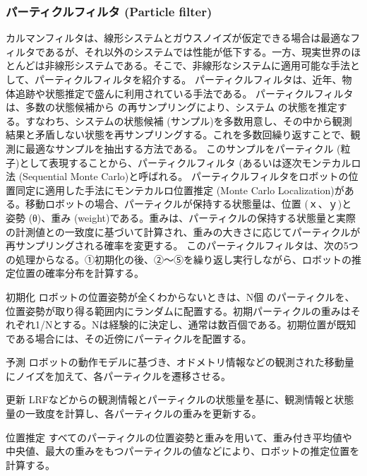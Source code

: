 \subsubsection{パーティクルフィルタ (Particle filter)}

カルマンフィルタは、線形システムとガウスノイズが仮定できる場合は最適なフィルタであるが、それ以外のシステムでは性能が低下する。一方、現実世界のほとんどは非線形システムである。そこで、非線形なシステムに適用可能な手法として、パーティクルフィルタを紹介する。
パーティクルフィルタは、近年、物体追跡や状態推定で盛んに利用されている手法である。 パーティクルフィルタは、多数の状態候補から  の再サンプリングにより、システム  の状態を推定する。すなわち、システムの状態候補 (サンプル)を多数用意し、その中から観測結果と矛盾しない状態を再サンプリングする。これを多数回繰り返すことで、観測に最適なサンプルを抽出する方法である。  このサンプルをパーティクル (粒子)として表現することから、パーティクルフィルタ (あるいは逐次モンテカルロ法 (Sequential Monte Carlo)と呼ばれる。
パーティクルフィルタをロボットの位置同定に適用した手法にモンテカルロ位置推定 (Monte Carlo Localization)がある。移動ロボットの場合、パーティクルが保持する状態量は、位置 (ｘ、ｙ)と姿勢 (θ)、重み (weight)である。重みは、パーティクルの保持する状態量と実際の計測値との一致度に基づいて計算され、重みの大きさに応じてパーティクルが再サンプリングされる確率を変更する。
このパーティクルフィルタは、次の5つの処理からなる。①初期化の後、②〜⑤を繰り返し実行しながら、ロボットの推定位置の確率分布を計算する。

\setcounter{num}{0}

\circled{\thenum} 初期化
ロボットの位置姿勢が全くわからないときは、N個  のパーティクルを、位置姿勢が取り得る範囲内にランダムに配置する。初期パーティクルの重みはそれぞれ1/Nとする。Nは経験的に決定し、通常は数百個である。初期位置が既知である場合には、その近傍にパーティクルを配置する。

\circled{\thenum} 予測
ロボットの動作モデルに基づき、オドメトリ情報などの観測された移動量にノイズを加えて、各パーティクルを遷移させる。

\circled{\thenum} 更新
LRFなどからの観測情報とパーティクルの状態量を基に、観測情報と状態量の一致度を計算し、各パーティクルの重みを更新する。

\circled{\thenum} 位置推定
すべてのパーティクルの位置姿勢と重みを用いて、重み付き平均値や中央値、最大の重みをもつパーティクルの値などにより、ロボットの推定位置を計算する。


